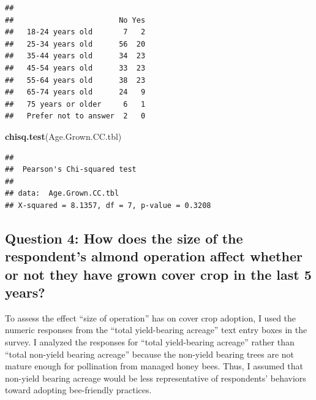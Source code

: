 \documentclass[12pt,]{article}
\newenvironment{Shaded}{\begin{snugshade}}{\end{snugshade}}
\newcommand{\KeywordTok}[1]{\textcolor[rgb]{0.13,0.29,0.53}{\textbf{#1}}}
\newcommand{\StringTok}[1]{\textcolor[rgb]{0.31,0.60,0.02}{#1}}
\newcommand{\CommentTok}[1]{\textcolor[rgb]{0.56,0.35,0.01}{\textit{#1}}}
\newcommand{\OperatorTok}[1]{\textcolor[rgb]{0.81,0.36,0.00}{\textbf{#1}}}
\newcommand{\NormalTok}[1]{#1}
\begin{document}
\begin{Shaded}
\end{Shaded}

\begin{verbatim}
##                       
##                        No Yes
##   18-24 years old       7   2
##   25-34 years old      56  20
##   35-44 years old      34  23
##   45-54 years old      33  23
##   55-64 years old      38  23
##   65-74 years old      24   9
##   75 years or older     6   1
##   Prefer not to answer  2   0
\end{verbatim}

\begin{Shaded}
\begin{Highlighting}[]
\KeywordTok{chisq.test}\NormalTok{(Age.Grown.CC.tbl)}
\end{Highlighting}
\end{Shaded}

\begin{verbatim}
## 
##  Pearson's Chi-squared test
## 
## data:  Age.Grown.CC.tbl
## X-squared = 8.1357, df = 7, p-value = 0.3208
\end{verbatim}

\FloatBarrier

\subsection{Question 4: How does the size of the respondent's almond
operation affect whether or not they have grown cover crop in the last 5
years?}\label{question-4-how-does-the-size-of-the-respondents-almond-operation-affect-whether-or-not-they-have-grown-cover-crop-in-the-last-5-years}

To assess the effect ``size of operation'' has on cover crop adoption, I
used the numeric responses from the ``total yield-bearing acreage'' text
entry boxes in the survey. I analyzed the responses for ``total
yield-bearing acreage'' rather than ``total non-yield bearing acreage''
because the non-yield bearing trees are not mature enough for
pollination from managed honey bees. Thus, I assumed that non-yield
bearing acreage would be less representative of respondents' behaviors
toward adopting bee-friendly practices.
\end{document}
